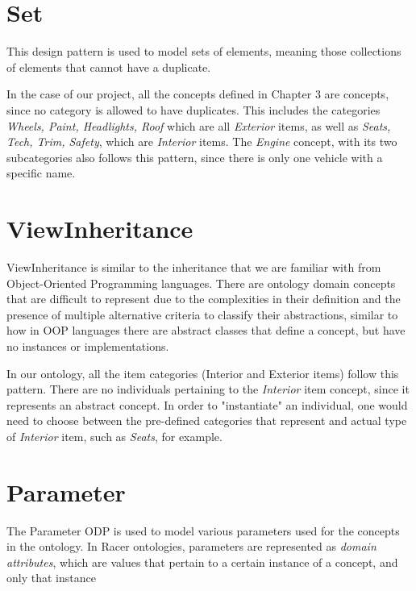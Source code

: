 \documentclass[a4paper,12pt]{report}
\begin{document}
\section{Set}
This design pattern is used to model sets of elements, meaning those collections of elements that cannot have a duplicate.

In the case of our project, all the concepts defined in Chapter 3 are concepts, since no category is allowed to have duplicates. This includes the categories \textit{Wheels, Paint, Headlights, Roof} which are all \textit{Exterior} items, as well as \textit{Seats, Tech, Trim, Safety}, which are \textit{Interior} items. The \textit{Engine} concept, with its two subcategories also follows this pattern, since there is only one vehicle with a specific name.

\section{ViewInheritance}
ViewInheritance is similar to the inheritance that we are familiar with from Object-Oriented Programming languages.   There are ontology domain concepts that are difficult to represent due to the complexities in their definition and the presence of multiple alternative criteria to classify their abstractions, similar to how in OOP languages there are abstract classes that define a concept, but have no instances or implementations.
\begin{center}
\end{center}

In our ontology, all the item categories (Interior and Exterior items) follow this pattern. There are no individuals pertaining to the \textit{Interior} item concept, since it represents an abstract concept. In order to "instantiate" an individual, one would need to choose between the pre-defined categories that represent and actual type of \textit{Interior} item, such as \textit{Seats}, for example. 

\section{Parameter}
The Parameter ODP is used to model various parameters used for the concepts in the ontology. In Racer ontologies, parameters are represented as \textit{domain attributes}, which are values that pertain to a certain instance of a concept, and only that instance

\begin{center}
\end{center}
\end{document}

